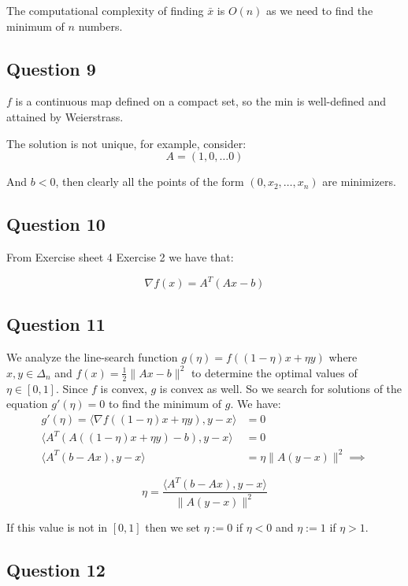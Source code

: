 \documentclass[12p]{article}
\begin{document}
The computational complexity of finding \(\bar x \) is \(O(n)\) as we need to find the minimum of \(n\) numbers.

\subsection*{Question 9} \hfil\par

\(f\) is a continuous map defined on a compact set, so the min is well-defined and attained by Weierstrass.

The solution is not unique, for example, consider:
\[
  A=(1, 0, \dots 0)  
\]

And \(b<0\), then clearly all the points of the form \((0, x_2, \dots, x_n)\) are minimizers.

\subsection*{Question 10} 
From Exercise sheet 4 Exercise 2 we have that:

\[
  \nabla f(x)=A^T(Ax-b)
\]

\subsection*{Question 11} \hfil\par

We analyze the line-search function \( g(\eta) = f((1 - \eta)x + \eta y) \) where \( x, y \in \Delta_n \) and \( f(x) = \frac{1}{2}\|Ax - b\|^2 \) to determine the optimal values of \( \eta \in [0, 1] \). Since \( f \) is convex, \( g \) is convex as well. So we search for solutions of the equation \( g'(\eta) = 0 \) to find the minimum of \( g \). We have:
\begin{align*}
    g'(\eta)=\langle \nabla f((1 - \eta)x + \eta y), y-x\rangle  &= 0\\
    \langle A^T(A((1 - \eta)x + \eta y)-b), y-x\rangle  &= 0\\
    \langle A^T(b-Ax), y-x\rangle  &= \eta\|A(y-x)\|^2\implies 
\end{align*}

\[
  \eta= \frac{\langle A^T(b-Ax), y-x\rangle}{\|A(y-x)\|^2}  
\]

If this value is not in \([0,1]\) then we set \(\eta:=0\) if \(\eta<0\) and \(\eta:=1\) if \(\eta>1\).
\subsection*{Question 12} 

    
    
\end{document}
